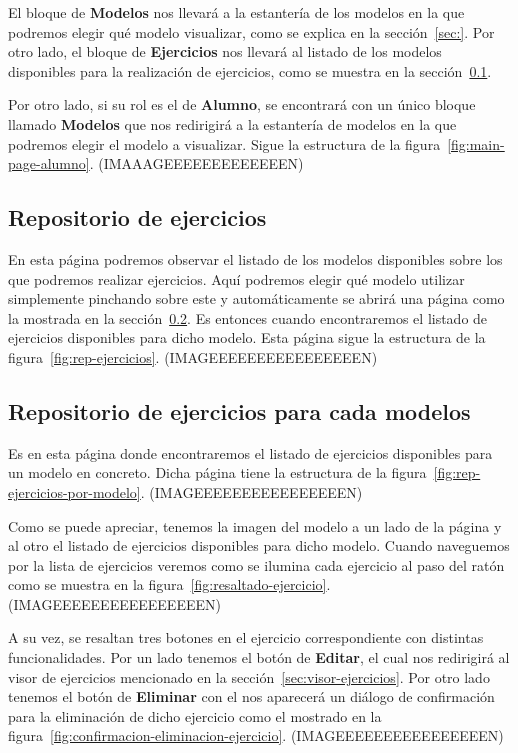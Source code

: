 El bloque de \textbf{Modelos} nos llevará a la estantería de los modelos en la que podremos elegir qué modelo visualizar, como se explica en la sección~\ref{sec:}. Por otro lado, el bloque de \textbf{Ejercicios} nos llevará al listado de los modelos disponibles para la realización de ejercicios, como se muestra en la sección~\ref{sec:rep-ejercicios}.

Por otro lado, si su rol es el de \textbf{Alumno}, se encontrará con un único bloque llamado \textbf{Modelos} que nos redirigirá a la estantería de modelos en la que podremos elegir el modelo a visualizar. Sigue la estructura de la figura~\ref{fig:main-page-alumno}.
(IMAAAGEEEEEEEEEEEEEN)

\subsection{Repositorio de ejercicios}\label{sec:rep-ejercicios}
En esta página podremos observar el listado de los modelos disponibles sobre los que podremos realizar ejercicios. Aquí podremos elegir qué modelo utilizar simplemente pinchando sobre este y automáticamente se abrirá una página como la mostrada en la sección~\ref{sec:rep-ejercicios-modelos}. Es entonces cuando encontraremos el listado de ejercicios disponibles para dicho modelo. Esta página sigue la estructura de la figura~\ref{fig:rep-ejercicios}.
(IMAGEEEEEEEEEEEEEEEEN)

\subsection{Repositorio de ejercicios para cada modelos}\label{sec:rep-ejercicios-modelos}
Es en esta página donde encontraremos el listado de ejercicios disponibles para un modelo en concreto. Dicha página tiene la estructura de la figura~\ref{fig:rep-ejercicios-por-modelo}.
(IMAGEEEEEEEEEEEEEEEEN)

Como se puede apreciar, tenemos la imagen del modelo a un lado de la página y al otro el listado de ejercicios disponibles para dicho modelo. Cuando naveguemos por la lista de ejercicios veremos como se ilumina cada ejercicio al paso del ratón como se muestra en la figura~\ref{fig:resaltado-ejercicio}.
(IMAGEEEEEEEEEEEEEEEEN)

A su vez, se resaltan tres botones en el ejercicio correspondiente con distintas funcionalidades. Por un lado tenemos el botón de \textbf{Editar}, el cual nos redirigirá al visor de ejercicios mencionado en la sección~\ref{sec:visor-ejercicios}. Por otro lado tenemos el botón de \textbf{Eliminar} con el nos aparecerá un diálogo de confirmación para la eliminación de dicho ejercicio como el mostrado en la figura~\ref{fig:confirmacion-eliminacion-ejercicio}.
(IMAGEEEEEEEEEEEEEEEEN)

